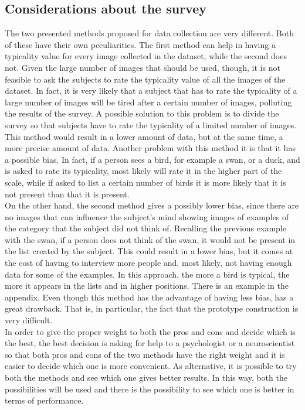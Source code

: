 \documentclass[conference]{IEEEtran}
\begin{document}
		\subsection{Considerations about the survey}
		
			\noindent The two presented methods proposed for data collection are very different. Both of these have their own peculiarities. The first method can help in having a typicality value for every image collected in the dataset, 
			while the second does not. Given the large number of images that should be used, though, it is not feasible to ask the subjects to rate the typicality value of all the images of the dataset. In fact, it is very likely 
			that a subject that has to rate the typicality of a large number of images will be tired after a certain number of images, polluting the results of the survey. A possible solution to this problem is to 
			divide the survey so that subjects have to rate the typicality of a limited number of images. This method would result in a lower amount of data, but at the same time, a more precise amount of data. Another 
			problem with this method it is that it has a possible bias. In fact, if a person sees a bird, for example a swan, or a duck, and is asked to rate its typicality, most likely will rate it in the higher part 
			of the scale, while if asked to list a certain number of birds it is more likely that it is not present than that it is present.\\
			On the other hand, the second method gives a possibly lower bias, since there are no images that can influence the subject's mind showing images of examples of the category that the subject did not think of. 
			Recalling the previous example with the swan, if a person does not think of the swan, it would not be present in the list created by the subject. This could result in a lower bias, but it comes at the cost 
			of having to interview more people and, most likely, not having enough data for some of the examples. In this approach, the more a bird is typical, the more it appears in the lists and in higher positions. 
			There is an example in the appendix. Even though this method has the advantage of having less bias, has a  great drawback. That is, in particular, the fact that the prototype construction is very difficult.\\
			In order to give the proper weight to both the pros and cons and decide which is the best, the best decision is asking for help to a psychologist or a neuroscientist so that both pros and cons of the two 
			methods have the right weight and it is easier to decide which one is more convenient.
			As alternative, it is possible to try both the methods and see which one gives better results. In this way, both the possibilities will be used and there is the possibility to see which one is better in 
			terms of performance. 
			
\end{document}
